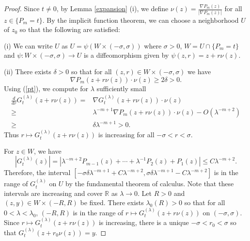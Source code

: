 \documentclass[pdflatex,sn-mathphys-num]{sn-jnl}%
\theoremstyle{thmstyleone}%
\theoremstyle{thmstyletwo}%
\theoremstyle{thmstylethree}%
\newcommand{\R}{\mathbb{R}}
\begin{document}
\begin{proof}

Since $t\neq0$, by Lemma \ref{expansion} (i), we define $\nu(z)=\frac{\nabla P_m(z)}{|\nabla P_m(z)|}$ for all $z\in \{P_m=t\}$. By the implicit function theorem, we can choose a neighborhood $U$ of $z_0$ so that the following are satisfied:

(i) We can write $U$ as $U=\psi(W\times (-\sigma,\sigma))$ where $\sigma>0$, $W=U\cap\{P_m=t\}$ and $\psi:W\times (-\sigma,\sigma)\to U$ is a diffeomorphism given by $\psi(z,r)=z+r\nu(z)$.

(ii) There exists $\delta>0$ so that for all $(z,r)\in W\times (-\sigma,\sigma)$ we have \[\nabla P_m(z+r\nu(z))\cdot \nu(z)\ge 2\delta >0.\]
Using (\ref{pt}), we compute for $\lambda$ sufficiently small
\[
\begin{aligned}
	\frac{d}{dr}G_t^{(\lambda)}(z+r\nu(z))=&\nabla G_t^{(\lambda)}(z+r\nu(z))\cdot \nu(z)\\
	\ge&\lambda^{-m+1}\nabla P_m(z+r\nu(z))\cdot \nu(z)-O(\lambda^{-m+2})\\
	\ge&\delta \lambda^{-m+1}>0.
\end{aligned}
\]
Thus $r\mapsto G_t^{(\lambda)}(z+r\nu(z))$ is increasing for all $-\sigma<r<\sigma$.

For $z\in W$, we have \[|G_t^{(\lambda)}(z)|=|\lambda^{-m+2}P_{m-1}(z)+\cdots +\lambda^{-1}P_2(z)+P_1(z)|\le C\lambda^{-m+2}.\]
Therefore, the interval $[-\sigma \delta \lambda^{-m+1}+C\lambda^{-m+2},\sigma \delta \lambda^{-m+1}-C\lambda^{-m+2}]$ is in the range of $G_t^{(\lambda)}$ on $U$ by the fundamental theorem of calculus. Note that these intervals are increasing and cover $\R$ as $\lambda\to0$. Let $R>0$ and $(z,y)\in W\times (-R,R)$ be fixed.  There exists $\lambda_0(R)>0$ so that for all $0<\lambda<\lambda_0$, $(-R,R)$ is in the range of $r\mapsto G_t^{(\lambda)}(z+r\nu(z))$ on $(-\sigma,\sigma)$. Since $r\mapsto G_t^{(\lambda)}(z+r\nu(z))$ is increasing, there is a unique $-\sigma<r_0<\sigma$ so that $G_t^{(\lambda)}(z+r_0\nu(z))=y$.


\end{proof}
\end{document}
